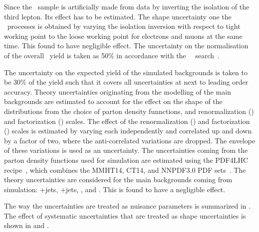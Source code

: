  Since the \NPL\ sample is artificially made from data by inverting the isolation of the third lepton. Its effect has to be estimated. The shape uncertainty one the \NPL\ processes is obtained by varying the isolation inversion with respect to tight working point to the loose working point for electrons and muons at the same time. This found to have negligible effect. The uncertainty on the normalisation of the overall \NPL\ yield is taken as 50\% in accordance with the \SM\ \tZq\ search~\cite{CMS-PAS-TOP-16-020}.
 
 The uncertainty on the expected yield of the simulated backgrounds is taken to be 30\% of the yield such that it covers all uncertainties at next to leading order accuracy. Theory uncertainties  originating from the modelling of the main backgrounds are estimated to account for the effect on the shape of the distributions from the choice of parton density funnctions, and renormalization (\muR) and factorization (\muF) scales. The effect of the  renormalization (\muR) and factorization (\muF) scales is estimated by varying each independently and correlated up and down by a factor of two, where the anti-correlated variations are dropped. The envelope of these variations is used as an uncertainty. The uncertainties coming from the parton density functions  used for simulation are estimated using the PDF4LHC recipe~\cite{Ball:2017nwa}, which combines the MMHT14, CT14, and NNPDF3.0 PDF sets~\cite{Ball:2017nwa}. The theory uncertainties are considered for the main backgrounds coming from simulation: \WZ+jets, \ZZ+jets, \ttZ, and \tZq. This is found to have a negligible effect.

 The way the uncertainties are treated as nuisance parameters is summarized in . The effect of systematic uncertainties that are treated as shape uncertainties is shown in  and  . 

